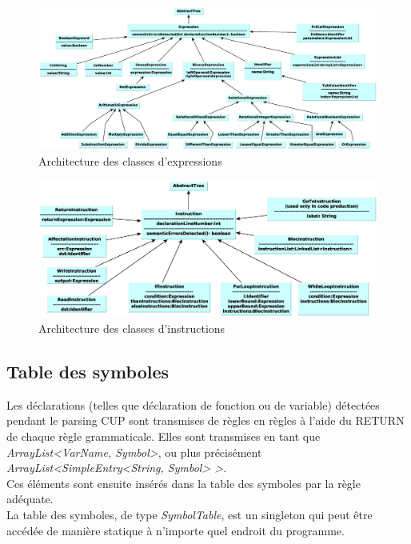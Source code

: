 \documentclass[11pt,a4paper]{article}
\begin{document}
    \begin{figure}[h]
    \includegraphics[width=1\textwidth,center]{../ressources/classesDExpressions.eps}
        \caption{Architecture des classes d'expressions}
   \end{figure}
   \newpage
    \begin{figure}[h]
    \includegraphics[width=1\textwidth,center]{../ressources/classesDInstructions.eps}
        \caption{Architecture des classes d'instructions}
   \end{figure}
  
  \subsection{Table des symboles}
  
  \par Les déclarations (telles que déclaration de fonction ou de variable) détectées pendant le parsing CUP sont transmises de règles en règles à l'aide du RETURN de chaque règle grammaticale. Elles sont transmises en tant que \textit{ArrayList<VarName, Symbol>}, ou plus précisément \textit{ArrayList<SimpleEntry<String, Symbol> >}. \\
  Ces éléments sont ensuite insérés dans la table des symboles par la règle adéquate. \\
  La table des symboles, de type \textit{SymbolTable}, est un singleton qui peut être accédée de manière statique à n'importe quel endroit du programme. 
  
\end{document}
